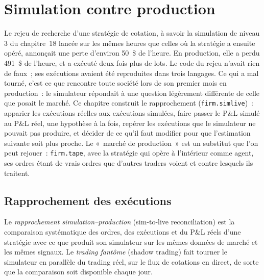 \chapter{Simulation contre production}\label{ch:rs:simulation-versus-live}

Le rejeu de recherche d'une stratégie de cotation, à savoir la simulation de niveau 3 du chapitre~18 lancée sur les mêmes heures que celles où la stratégie a ensuite opéré, annonçait une perte
d'environ 50~\$ de l'heure. En production, elle a perdu 491~\$ de l'heure, et a exécuté deux fois plus de lots. Le code du rejeu n'avait rien de faux~; ses exécutions avaient été reproduites
dans trois langages. Ce qui a mal tourné, c'est ce que rencontre toute société lors de son premier mois en production~: le simulateur répondait à une question légèrement différente de celle que posait
le marché. Ce chapitre construit le rapprochement (\texttt{firm.simlive})~: apparier les exécutions réelles aux exécutions simulées, faire passer le P\&L simulé au
P\&L réel, une hypothèse à la fois, repérer les exécutions que le simulateur ne pouvait pas produire, et décider de ce qu'il faut modifier pour que l'estimation suivante soit plus proche. Le
«~marché de production~» est un substitut que l'on peut rejouer~: \texttt{firm.tape}, avec la stratégie qui opère à l'intérieur comme agent, ses ordres étant de vrais ordres que d'autres traders
voient et contre lesquels ils traitent.

\section{Rapprochement des exécutions}

\begin{definition}\label{def:rs:simulation-versus-live:reconciliation}
Le \emph{rapprochement simulation--production} (sim-to-live reconciliation) est la comparaison systématique des ordres, des exécutions et du P\&L réels d'une stratégie avec ce que produit son
simulateur sur les mêmes données de marché et les mêmes signaux. Le \emph{trading fantôme} (shadow trading) fait tourner le simulateur en parallèle du trading réel,
sur le flux de cotations en direct, de sorte que la comparaison soit disponible chaque jour.
\end{definition}

